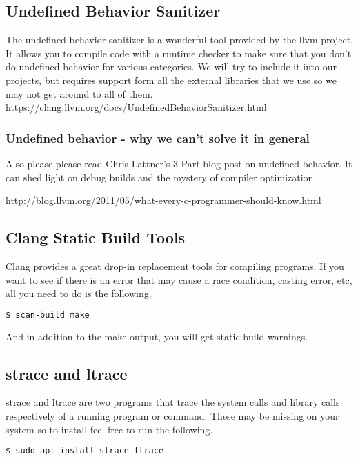 \subsection{Undefined Behavior Sanitizer}

The undefined behavior sanitizer is a wonderful tool provided by the llvm project.
It allows you to compile code with a runtime checker to make sure that you don't do undefined behavior for various categories.
We will try to include it into our projects, but requires support form all the external libraries that we use so we may not get around to all of them.
\url{https://clang.llvm.org/docs/UndefinedBehaviorSanitizer.html}

\subsubsection{Undefined behavior - why we can't solve it in general}

Also please please read Chris Lattner's 3 Part blog post on undefined behavior. It can shed light on debug builds and the mystery of compiler optimization.

\url{http://blog.llvm.org/2011/05/what-every-c-programmer-should-know.html}


\subsection{Clang Static Build Tools}

Clang provides a great drop-in replacement tools for compiling programs.
If you want to see if there is an error that may cause a race condition, casting error, etc, all you need to do is the following.

\begin{lstlisting}[language=bash]
$ scan-build make
\end{lstlisting}

And in addition to the make output, you will get static build warnings.

\subsection{strace and ltrace}

strace and ltrace are two programs that trace the system calls and library calls respectively of a running program or command.
These may be missing on your system so to install feel free to run the following.

\begin{lstlisting}[language=bash]
$ sudo apt install strace ltrace
\end{lstlisting}

